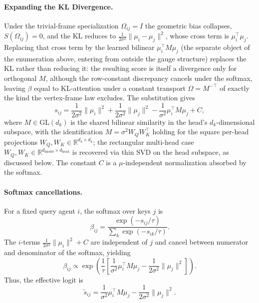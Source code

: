 \documentclass[11pt]{article}
\begin{document}
\paragraph{Expanding the KL Divergence.}
Under the trivial-frame specialization $\Omega_{ij} = I$ the geometric bias collapses, $S(\Omega_{ij}) = 0$, and the KL reduces to $\frac{1}{2\sigma^2}\|\mu_i - \mu_j\|^2$, whose cross term is $\mu_i^\top\mu_j$. Replacing that cross term by the learned bilinear $\mu_i^\top M \mu_j$ (the separate object of the enumeration above, entering from outside the gauge structure) replaces the KL rather than reducing it: the resulting score is itself a divergence only for orthogonal $M$, although the row-constant discrepancy cancels under the softmax, leaving $\beta$ equal to KL-attention under a constant transport $\Omega = M^{-\top}$ of exactly the kind the vertex-frame law excludes. The substitution gives
\begin{equation}
s_{ij} = \frac{1}{2\sigma^2}\|\mu_i\|^2 + \frac{1}{2\sigma^2}\|\mu_j\|^2 - \frac{1}{\sigma^2}\mu_i^\top M \mu_j + C,
\end{equation}
where $M \in \mathrm{GL}(d_k)$ is the shared bilinear similarity in the head's $d_k$-dimensional subspace, with the identification $M = \sigma^2 W_Q W_K^\top$ holding for the square per-head projections $W_Q, W_K \in \mathbb{R}^{d_k \times d_k}$; the rectangular multi-head case $W_Q, W_K \in \mathbb{R}^{d_{\text{model}}\times d_{\text{head}}}$ is recovered via thin SVD on the head subspace, as discussed below. The constant $C$ is a $\mu$-independent normalization absorbed by the softmax.

\paragraph{Softmax cancellations.}
For a fixed query agent $i$, the softmax over keys $j$ is
\begin{equation}
\beta_{ij} = \frac{\exp(-s_{ij}/\tau)}{\sum_k \exp(-s_{ik}/\tau)}.
\end{equation}
The $i$-terms $\frac{1}{2\sigma^2}\|\mu_i\|^2 + C$ are independent of $j$ and cancel between numerator and denominator of the softmax, yielding
\begin{equation}
\beta_{ij} \propto \exp\left(\frac{1}{\tau}\left[\frac{1}{\sigma^2}\mu_i^\top M \mu_j - \frac{1}{2\sigma^2}\|\mu_j\|^2\right]\right).
\end{equation}
Thus, the effective logit is
\begin{equation}
\tilde{s}_{ij} = \frac{1}{\sigma^2}\mu_i^\top M \mu_j - \frac{1}{2\sigma^2}\|\mu_j\|^2.
\end{equation}
\end{document}
